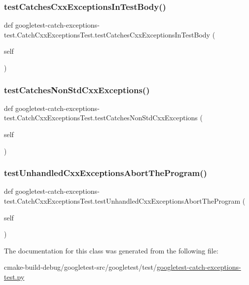 \subsubsection{\texorpdfstring{testCatchesCxxExceptionsInTestBody()}{testCatchesCxxExceptionsInTestBody()}}
{\footnotesize\ttfamily def googletest-\/catch-\/exceptions-\/test.\+Catch\+Cxx\+Exceptions\+Test.\+test\+Catches\+Cxx\+Exceptions\+In\+Test\+Body (\begin{DoxyParamCaption}\item[{}]{self }\end{DoxyParamCaption})}

\mbox{\label{classgoogletest-catch-exceptions-test_1_1CatchCxxExceptionsTest_a01731aaf8269fc952559f5684b395119}} 
\subsubsection{\texorpdfstring{testCatchesNonStdCxxExceptions()}{testCatchesNonStdCxxExceptions()}}
{\footnotesize\ttfamily def googletest-\/catch-\/exceptions-\/test.\+Catch\+Cxx\+Exceptions\+Test.\+test\+Catches\+Non\+Std\+Cxx\+Exceptions (\begin{DoxyParamCaption}\item[{}]{self }\end{DoxyParamCaption})}

\mbox{\label{classgoogletest-catch-exceptions-test_1_1CatchCxxExceptionsTest_ab2304b62b833f0729e8909ad8615212c}} 
\subsubsection{\texorpdfstring{testUnhandledCxxExceptionsAbortTheProgram()}{testUnhandledCxxExceptionsAbortTheProgram()}}
{\footnotesize\ttfamily def googletest-\/catch-\/exceptions-\/test.\+Catch\+Cxx\+Exceptions\+Test.\+test\+Unhandled\+Cxx\+Exceptions\+Abort\+The\+Program (\begin{DoxyParamCaption}\item[{}]{self }\end{DoxyParamCaption})}



The documentation for this class was generated from the following file\+:\begin{DoxyCompactItemize}
\item 
cmake-\/build-\/debug/googletest-\/src/googletest/test/\mbox{\hyperlink{googletest-catch-exceptions-test_8py}{googletest-\/catch-\/exceptions-\/test.\+py}}\end{DoxyCompactItemize}
